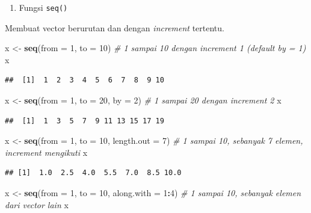 \documentclass[]{book}
\newenvironment{Shaded}{\begin{snugshade}}{\end{snugshade}}
\newcommand{\CommentTok}[1]{\textcolor[rgb]{0.56,0.35,0.01}{\textit{#1}}}
\newcommand{\DataTypeTok}[1]{\textcolor[rgb]{0.13,0.29,0.53}{#1}}
\newcommand{\DecValTok}[1]{\textcolor[rgb]{0.00,0.00,0.81}{#1}}
\newcommand{\KeywordTok}[1]{\textcolor[rgb]{0.13,0.29,0.53}{\textbf{#1}}}
\newcommand{\NormalTok}[1]{#1}
\newcommand{\OperatorTok}[1]{\textcolor[rgb]{0.81,0.36,0.00}{\textbf{#1}}}
\newcommand{\StringTok}[1]{\textcolor[rgb]{0.31,0.60,0.02}{#1}}
\providecommand{\tightlist}{%
  \setlength{\itemsep}{0pt}\setlength{\parskip}{0pt}}
\begin{document}
\begin{enumerate}
\def\labelenumi{\arabic{enumi}.}
\setcounter{enumi}{2}
\tightlist
\item
  Fungsi \texttt{seq()}
\end{enumerate}

Membuat vector berurutan dan dengan \emph{increment} tertentu.

\begin{Shaded}
\begin{Highlighting}[]
\NormalTok{x <-}\StringTok{ }\KeywordTok{seq}\NormalTok{(}\DataTypeTok{from =} \DecValTok{1}\NormalTok{, }\DataTypeTok{to =} \DecValTok{10}\NormalTok{) }\CommentTok{# 1 sampai 10 dengan increment 1 (default by = 1)}
\NormalTok{x}
\end{Highlighting}
\end{Shaded}

\begin{verbatim}
##  [1]  1  2  3  4  5  6  7  8  9 10
\end{verbatim}

\begin{Shaded}
\begin{Highlighting}[]
\NormalTok{x <-}\StringTok{ }\KeywordTok{seq}\NormalTok{(}\DataTypeTok{from =} \DecValTok{1}\NormalTok{, }\DataTypeTok{to =} \DecValTok{20}\NormalTok{, }\DataTypeTok{by =} \DecValTok{2}\NormalTok{) }\CommentTok{# 1 sampai 20 dengan increment 2}
\NormalTok{x}
\end{Highlighting}
\end{Shaded}

\begin{verbatim}
##  [1]  1  3  5  7  9 11 13 15 17 19
\end{verbatim}

\begin{Shaded}
\begin{Highlighting}[]
\NormalTok{x <-}\StringTok{ }\KeywordTok{seq}\NormalTok{(}\DataTypeTok{from =} \DecValTok{1}\NormalTok{, }\DataTypeTok{to =} \DecValTok{10}\NormalTok{, }\DataTypeTok{length.out =} \DecValTok{7}\NormalTok{) }\CommentTok{# 1 sampai 10, sebanyak 7 elemen, increment mengikuti}
\NormalTok{x}
\end{Highlighting}
\end{Shaded}

\begin{verbatim}
## [1]  1.0  2.5  4.0  5.5  7.0  8.5 10.0
\end{verbatim}

\begin{Shaded}
\begin{Highlighting}[]
\NormalTok{x <-}\StringTok{ }\KeywordTok{seq}\NormalTok{(}\DataTypeTok{from =} \DecValTok{1}\NormalTok{, }\DataTypeTok{to =} \DecValTok{10}\NormalTok{, }\DataTypeTok{along.with =} \DecValTok{1}\OperatorTok{:}\DecValTok{4}\NormalTok{) }\CommentTok{# 1 sampai 10, sebanyak elemen dari vector lain}
\NormalTok{x}
\end{Highlighting}
\end{Shaded}
\end{document}
